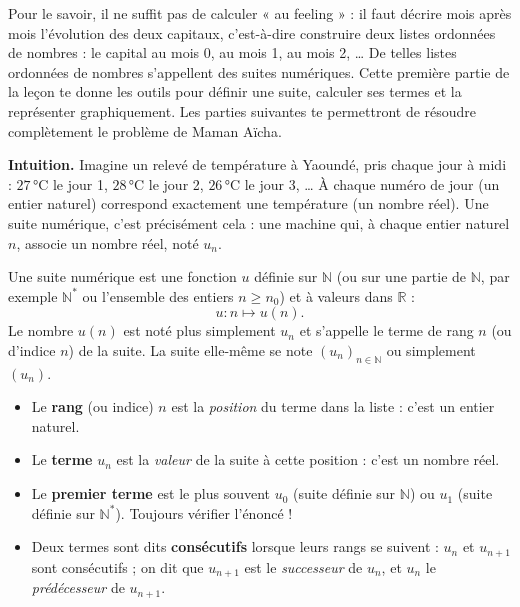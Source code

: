\documentclass[11pt]{article}
\newcommand{\cle}[1]{{\popxbold\color{popdark}#1}}
\newcounter{popsec}
\newcounter{popsub}
\newcommand{\courssub}[1]{%
  \stepcounter{popsub}%
  \par\vspace{9pt}\noindent{\popxbold\fontsize{11.5}{13}\selectfont\color{popink}{\color{poporange}\thepopsec.\thepopsub}\hspace{6pt}#1}\par\nopagebreak\vspace{4pt}
}
\begin{document}
Pour le savoir, il ne suffit pas de calculer « au feeling » : il faut décrire mois après mois l'évolution des deux capitaux, c'est-à-dire construire deux listes ordonnées de nombres : le capital au mois 0, au mois 1, au mois 2, \dots{} De telles listes ordonnées de nombres s'appellent des \cle{suites numériques}. Cette première partie de la leçon te donne les outils pour définir une suite, calculer ses termes et la représenter graphiquement. Les parties suivantes te permettront de résoudre complètement le problème de Maman Aïcha.

\courssub{Notion de suite numérique}

\textbf{Intuition.} Imagine un relevé de température à Yaoundé, pris chaque jour à midi : $27\,\text{°C}$ le jour 1, $28\,\text{°C}$ le jour 2, $26\,\text{°C}$ le jour 3, \dots{} À chaque numéro de jour (un entier naturel) correspond exactement une température (un nombre réel). Une suite numérique, c'est précisément cela : une machine qui, à chaque entier naturel $n$, associe un nombre réel, noté $u_n$.

\begin{definition}
Une \cle{suite numérique} est une fonction $u$ définie sur $\mathbb{N}$ (ou sur une partie de $\mathbb{N}$, par exemple $\mathbb{N}^*$ ou l'ensemble des entiers $n \geq n_0$) et à valeurs dans $\mathbb{R}$ :
\[ u : n \longmapsto u(n). \]
Le nombre $u(n)$ est noté plus simplement $u_n$ et s'appelle le \cle{terme} de \cle{rang} $n$ (ou d'\cle{indice} $n$) de la suite. La suite elle-même se note $(u_n)_{n \in \mathbb{N}}$ ou simplement $(u_n)$.
\end{definition}

\begin{aretenir}
\begin{itemize}
\item Le \textbf{rang} (ou indice) $n$ est la \emph{position} du terme dans la liste : c'est un entier naturel.
\item Le \textbf{terme} $u_n$ est la \emph{valeur} de la suite à cette position : c'est un nombre réel.
\item Le \textbf{premier terme} est le plus souvent $u_0$ (suite définie sur $\mathbb{N}$) ou $u_1$ (suite définie sur $\mathbb{N}^*$). Toujours vérifier l'énoncé !
\item Deux termes sont dits \textbf{consécutifs} lorsque leurs rangs se suivent : $u_n$ et $u_{n+1}$ sont consécutifs ; on dit que $u_{n+1}$ est le \emph{successeur} de $u_n$, et $u_n$ le \emph{prédécesseur} de $u_{n+1}$.
\end{itemize}
\end{aretenir}
\end{document}
